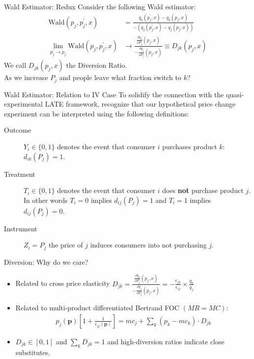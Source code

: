 \documentclass[xcolor=pdftex,dvipsnames,table,mathserif,aspectratio=169]{beamer}
\begin{document}
\begin{frame}{Wald Estimator: Redux}
Consider the following Wald estimator:
\begin{align*}
\text{Wald}\left(p_{j}, p_{j}^{\prime}, x\right)&=\frac{q_{k}\left(p_{j}^{\prime}, x\right)-q_{k}\left(p_{j}, x\right)}{-\left(q_{j}\left(p_{j}^{\prime}, x\right)-q_{j}\left(p_{j}, x\right)\right)} \\
\lim _{p_{j}^{\prime}  \rightarrow p_{j}} \text{Wald}\left(p_{j}, p_{j}^{\prime}, x\right) &\rightarrow \frac{\frac{\partial q_{k}}{\partial P_{j}}\left(p_{j}, x\right)}{-\frac{\partial q_{j}}{\partial P_{j}}\left(p_{j}, x\right)} \equiv D_{j k}\left(p_{j}, x\right)
\end{align*}
We call $D_{j k}\left(p_{j}, x\right)$ the \alert{Diversion Ratio}.\\
 As we increase $P_j$ and people leave what fraction switch to $k$?
\end{frame}

\begin{frame}{Wald Estimator: Relation to IV Case}
To solidify the connection with the quasi-experimental LATE framework, recognize that our hypothetical price change experiment can be interpreted using the following definitions:
\begin{description}
\item[Outcome] $Y_i \in \{0,1\}$ denotes the event that consumer $i$ purchases product $k$: $d_{ik}(P_j)=1$.
\item[Treatment] $T_i \in \{0,1\}$ denotes the event that consumer $i$ does \textbf{not} purchase product $j$. In other words $T_i = 0$ implies $d_{ij}(P_j)=1$ and $T_i=1$ implies $d_{ij}(P_j)=0$.
\item[Instrument] $Z_i = P_j$ the price of $j$ induces consumers into not purchasing $j$.
\end{description}
\end{frame}


\begin{frame}{Diversion: Why do we care?}
\begin{itemize}
\item Related to \alert{cross price elasticity} $D_{jk} =\frac{\frac{\partial q_{k}}{\partial P_{j}}\left(p_{j}, x\right)}{-\frac{\partial q_{j}}{\partial P_{j}}\left(p_{j}, x\right)} = -\frac{\epsilon_{jk}}{\epsilon_{jj}} \times \frac{q_k}{q_j} $
\item Related to multi-product differentiated Bertrand FOC $(MR = MC)$:
\begin{align*}
p_j(\mathbf{p})\left[1 +  \frac{1}{\epsilon_{jj}(\mathbf{p})}  \right] =  mc_j + \sum_k (p_k -mc_k) \cdot D_{jk} 
\end{align*}
\item $D_{jk} \in [0,1]$ and $\sum_k D_{jk} =1$ and high-diversion ratios indicate close substitutes.
\end{itemize}
\end{frame}
\end{document}
